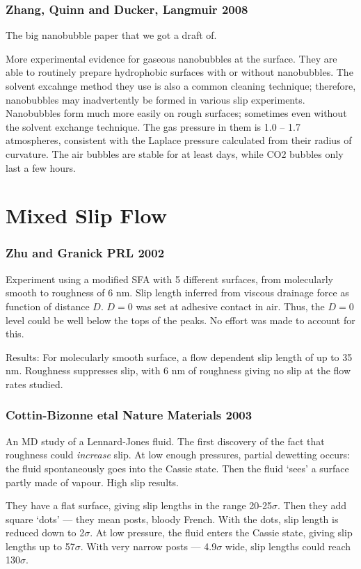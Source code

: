 \documentclass{article}
\begin{document}
\subsubsection*{Zhang, Quinn and Ducker, Langmuir 2008}
The big nanobubble paper that we got a draft of.

More experimental evidence for gaseous nanobubbles at the surface.  They are able to routinely prepare hydrophobic surfaces with or without nanobubbles.  The solvent excahnge method they use is also a common cleaning technique; therefore, nanobubbles may inadvertently be formed in various slip experiments.  Nanobubbles form much more easily on rough surfaces; sometimes even without the solvent exchange technique.
The gas pressure in them is 1.0 -- 1.7 atmospheres, consistent with the Laplace pressure calculated from their radius of curvature.  The air bubbles are stable for at least days, while CO2 bubbles only last a few hours.


\section*{Mixed Slip Flow}

\subsubsection*{Zhu and Granick PRL 2002}
Experiment using a modified SFA with 5 different surfaces, from molecularly smooth to roughness of 6 nm. Slip length inferred from viscous drainage force as function of distance $D$. $D=0$ was set at adhesive contact in air. Thus, the $D=0$ level could be well below the tops of the peaks. No effort was made to account for this.

Results: For molecularly smooth surface, a flow dependent slip length of up to 35 nm. Roughness suppresses slip, with 6 nm of roughness giving no slip at the flow rates studied.

\subsubsection*{Cottin-Bizonne etal Nature Materials 2003}
An MD study of a Lennard-Jones fluid. The first discovery of the fact that roughness could \emph{increase} slip. At low enough pressures, partial dewetting occurs: the fluid spontaneously goes into the Cassie state. Then the fluid `sees' a surface partly made of vapour. High slip results.

They have a flat surface, giving slip lengths in the range 20-25$\sigma$. Then they add square `dots' --- they mean posts, bloody French. With the dots, slip length is reduced down to 2$\sigma$. At low pressure, the fluid enters the Cassie state, giving slip lengths up to 57$\sigma$. With very narrow posts --- 4.9$\sigma$ wide, slip lengths could reach 130$\sigma$.
\end{document}

